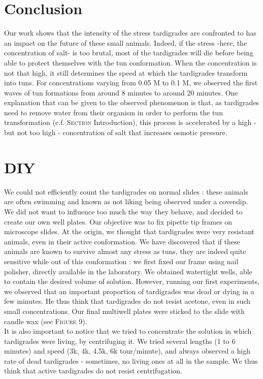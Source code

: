 \documentclass[12pt,a4paper, twocolumn]{article}
\begin{document}
\section{Conclusion}
Our work shows that the intensity of the stress tardigrades are confronted to has an impact on the future of these small animals. Indeed, if the stress -here, the concentration of salt- is too brutal, most of the tardigrades will die before being able to protect themselves with the tun conformation. When the concentration is not that high, it still determines the speed at which the tardigrades transform into tuns. For concentrations varying from 0.05 M to  0.1 M, we observed the first waves of tun formations from around 8 minutes to around 20 minutes. One explanation that can be given to the observed phenomenon is that, as tardigrades need to remove water from their organism in order to perform the tun transformation (c.f. \textsc{Section} Introduction), this process is accelerated by a high - but not too high - concentration of salt that increases osmotic pressure. 


\newpage


\section*{DIY}
We could not efficiently count the tardigrades on normal slides : these animals are often swimming and known as not liking being observed under a coverslip. We did not want to influence too much the way they behave, and decided to create our own well plates. Our objective was to fix pipette tip frames on microscope slides. At the origin, we thought that tardigrades were very resistant animals, even in their active conformation. We have discovered that if these animals are known to survive almost any stress as tuns, they are indeed quite sensitive while out of this conformation : we first fixed our frame using nail polisher, directly available in the laboratory. We obtained watertight wells, able to contain the desired volume of solution. However, running our first experiments, we observed that an important proportion of tardigrades was dead or dying in a few minutes. He thus think that tardigrades do not resist acetone, even in such small concentrations. Our final multiwell plates were sticked to the slide with candle wax (see \textsc{Figure} 9).\\

It is also important to notice that we tried to concentrate the solution in which tardigrades were living, by centrifuging it. We tried several lengths (1 to 6 minutes) and speed (3k, 4k, 4.5k, 6k tour/minute), and always observed a high rate of dead tardigrades - sometimes, no living ones at all in the sample. We thus think that active tardigrades do not resist centrifugation.
\end{document}
